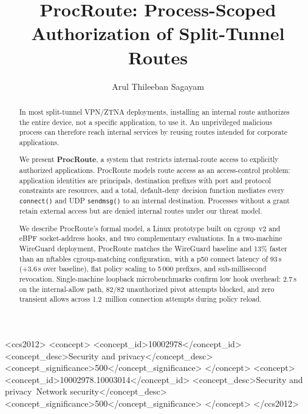 \documentclass[sigconf]{acmart}
\begin{document}
\title{ProcRoute: Process-Scoped Authorization of Split-Tunnel Routes}

\author{Arul Thileeban Sagayam}

\begin{abstract}
In most split-tunnel VPN/ZTNA deployments, installing an internal route
authorizes the entire device, not a specific application, to use it.
An unprivileged malicious process can therefore reach internal
services by reusing routes intended for corporate applications.

We present \textbf{ProcRoute}, a system that restricts
internal-route access to explicitly authorized applications.
ProcRoute models route access as an access-control problem:
application identities are principals,
destination prefixes with port and protocol constraints are
resources, and a total, default-deny decision function mediates
every \texttt{connect()} and UDP \texttt{sendmsg()} to an internal
destination.
Processes without a grant retain external access but are denied
internal routes under our threat model.

We describe ProcRoute's formal model, a Linux
prototype built on cgroup~v2 and eBPF socket-address hooks, and
two complementary evaluations.
In a two-machine WireGuard deployment,
ProcRoute matches the WireGuard baseline and
13\% faster than an nftables cgroup-matching configuration, with a
p50 connect latency of 93\,\textmu{}s (+3.6\,\textmu{}s over
baseline), flat policy scaling to 5\,000 prefixes, and
sub-millisecond revocation.
Single-machine loopback microbenchmarks confirm low hook overhead:
2.7\,\textmu{}s on the internal-allow path,
82/82 unauthorized pivot attempts blocked, and zero
transient allows across 1.2~million connection attempts during
policy reload.
\end{abstract}

\begin{CCSXML}
<ccs2012>
   <concept>
       <concept_id>10002978</concept_id>
       <concept_desc>Security and privacy</concept_desc>
       <concept_significance>500</concept_significance>
       </concept>
   <concept>
       <concept_id>10002978.10003014</concept_id>
       <concept_desc>Security and privacy~Network security</concept_desc>
       <concept_significance>500</concept_significance>
       </concept>
 </ccs2012>
\end{CCSXML}

\end{document}
